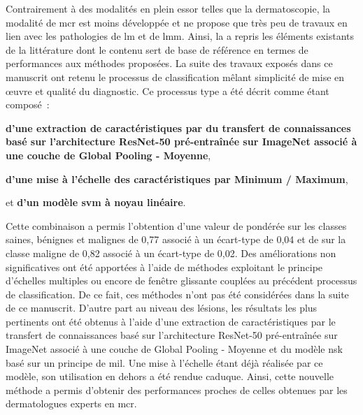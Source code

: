 Contrairement à des modalités en plein essor telles que la dermatoscopie, la modalité de \gls{mcr} est moins développée et ne propose que très peu de travaux en lien avec les pathologies de \gls{lm} et de \gls{lmm}. Ainsi, la  a repris les éléments existants de la littérature dont le contenu sert de base de référence en termes de performances aux méthodes proposées. La suite des travaux exposés dans ce manuscrit ont retenu le processus de classification mêlant simplicité de mise en œuvre et qualité du diagnostic. Ce processus type a été décrit comme étant composé~:
\begin{inlinerate}
    \item \textbf{d'une extraction de caractéristiques par du transfert de connaissances basé sur l'architecture ResNet-50 pré-entraînée sur ImageNet associé à une couche de Global Pooling - Moyenne},
    \item \textbf{d'une mise à l'échelle des caractéristiques par Minimum / Maximum},
    \item et \textbf{d'un modèle \gls{svm} à noyau linéaire}.
\end{inlinerate} Cette combinaison a permis l'obtention d'une valeur de \fscore{} pondérée sur les classes saines, bénignes et malignes de 0,77 associé à un écart-type de 0,04 et de \fscore{} sur la classe maligne de 0,82 associé à un écart-type de 0,02. Des améliorations non significatives ont été apportées à l'aide de méthodes exploitant le principe d'échelles multiples ou encore de fenêtre glissante couplées au précédent processus de classification. De ce fait, ces méthodes n'ont pas été considérées dans la suite de ce manuscrit. D'autre part au niveau des lésions, les résultats les plus pertinents ont été obtenus à l'aide d'une extraction de caractéristiques par le transfert de connaissances basé sur l'architecture ResNet-50 pré-entraînée sur ImageNet associé à une couche de Global Pooling - Moyenne et du modèle \gls{nsk} basé sur un principe de \gls{mil}. Une mise à l'échelle étant déjà réalisée par ce modèle, son utilisation en dehors a été rendue caduque. Ainsi, cette nouvelle méthode a permis d'obtenir des performances proches de celles obtenues par les dermatologues experts en \gls{mcr}.\par


